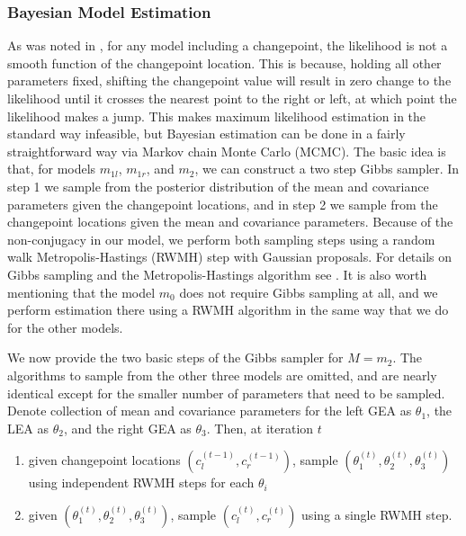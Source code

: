 \documentclass[12pt]{article}
\providecommand{\tightlist}{%
  \setlength{\itemsep}{0pt}\setlength{\parskip}{0pt}}
\begin{document}
\subsubsection{Bayesian Model Estimation}

As was noted in \citep{stephens1994}, for any model including a
changepoint, the likelihood is not a smooth function of the changepoint
location. This is because, holding all other parameters fixed, shifting
the changepoint value will result in zero change to the likelihood until
it crosses the nearest point to the right or left, at which point the
likelihood makes a jump. This makes maximum likelihood estimation in the
standard way infeasible, but Bayesian estimation can be done in a fairly
straightforward way via Markov chain Monte Carlo (MCMC). The basic idea
is that, for models \(m_{1l}\), \(m_{1r}\), and \(m_2\), we can
construct a two step Gibbs sampler. In step 1 we sample from the
posterior distribution of the mean and covariance parameters given the
changepoint locations, and in step 2 we sample from the changepoint
locations given the mean and covariance parameters. Because of the
non-conjugacy in our model, we perform both sampling steps using a
random walk Metropolis-Hastings (RWMH) step with Gaussian proposals. For
details on Gibbs sampling and the Metropolis-Hastings algorithm see
\citep{gelman2013}. It is also worth mentioning that the model \(m_0\)
does not require Gibbs sampling at all, and we perform estimation there
using a RWMH algorithm in the same way that we do for the other models.

We now provide the two basic steps of the Gibbs sampler for \(M = m_2\).
The algorithms to sample from the other three models are omitted, and
are nearly identical except for the smaller number of parameters that
need to be sampled. Denote collection of mean and covariance parameters
for the left GEA as \(\theta_1\), the LEA as \(\theta_2\), and the right
GEA as \(\theta_3\). Then, at iteration \(t\)

\begin{enumerate}
\def\labelenumi{\arabic{enumi}.}
\tightlist
\item
  given changepoint locations \((c_l^{(t - 1)}, c_r^{(t - 1)})\), sample
  \((\theta_1^{(t)}, \theta_2^{(t)}, \theta_3^{(t)})\) using independent
  RWMH steps for each \(\theta_i\)
\item
  given \((\theta_1^{(t)}, \theta_2^{(t)}, \theta_3^{(t)})\), sample
  \((c_l^{(t)}, c_r^{(t)})\) using a single RWMH step.
\end{enumerate}
\end{document}

